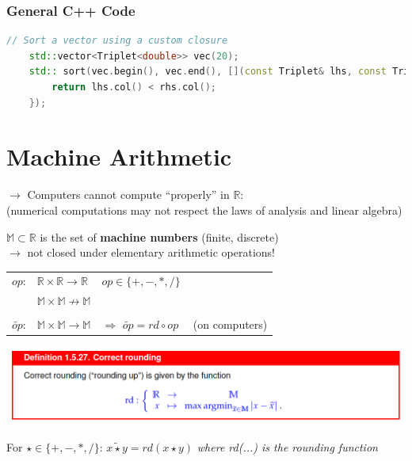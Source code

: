 \documentclass[12pt, a4paper]{article}
\newcommand{\R}{\mathbb{R}}
\newcommand{\M}{\mathbb{M}}
\begin{document}
\subsubsection{General C++ Code}
\begin{lstlisting}[language=C++]
	// Sort a vector using a custom closure
	std::vector<Triplet<double>> vec(20);
	std:: sort(vec.begin(), vec.end(), [](const Triplet& lhs, const Triplet& rhs) {
		return lhs.col() < rhs.col(); 
	});
\end{lstlisting}

\newpage
\section{Machine Arithmetic}

$\rightarrow$ Computers cannot compute “properly” in $\R$: \\
(numerical computations may not respect the laws of analysis and linear algebra)\newline

$\M \subset \R$ is the set of \textbf{machine numbers} (finite, discrete) \\
$\rightarrow$ not closed under elementary arithmetic operations! \\

\begin{tabular}{lll}
	$op$: 	& 		$\R \times \R \rightarrow \R$ & 			$op \in \lbrace +, -, *, / \rbrace$	\\
			& 		$\M \times \M \not\rightarrow \M$  											\\
																								\\
	$\widetilde{op}$: &  		$\M \times \M \rightarrow \M$ 	& $\Rightarrow$ $\widetilde{op} = rd \circ op \quad $ (on computers) 
\end{tabular}

\begin{center}
	\includegraphics[width=1.0\textwidth]{rounding_function.png}
\end{center}

\begin{tcolorbox}
\hspace{3mm}	
	For $\star \in \lbrace +, -, *, / \rbrace$: \quad $x \widetilde{\star} y = rd(x \star y)$  \quad \textit{where rd(...) is the rounding function} 
\hspace{3mm}	
\end{tcolorbox}
\hspace{3mm}	
\end{document}
